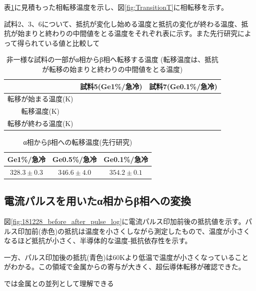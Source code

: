 表\ref{tab:transT}に見積もった相転移温度を示し、図\ref{fig:TransitionT}に相転移を示す。

試料2、3、6について、抵抗が変化し始める温度と抵抗の変化が終わる温度、抵抗が始まりと終わりの中間値をとる温度をそれぞれ表に示す。また先行研究によって得られている値と比較して
\begin{table}[!h]
  \begin{center}
  \begin{tabular}{ccc}
    & 試料5(Ge1\%/急冷) & 試料7(Ge0.1\%/急冷)\\ \hline
     転移が始まる温度(K)& &  \\
     転移温度(K)& &  \\
     転移が終わる温度(K)&  &  \\
  \end{tabular}
  \caption{非一様な試料の一部がα相からβ相へ転移する温度 (転移温度は、抵抗が転移の始まりと終わりの中間値をとる温度)}
  \label{tab:transT}
    \end{center}
\end{table}

\begin{table}[!h]
    \begin{center}
  \begin{tabular}{ccc}
    Ge1\%/急冷 & Ge0.5\%/急冷 & Ge0.1\%/急冷  \\ \hline
    $328.3\pm0.3$ & $346.6\pm4.0$ & $354.2\pm0.1$ \\
  \end{tabular}
  \caption{α相からβ相への転移温度(先行研究\cite{})}
  \label{tab:transT_ref}
    \end{center}
\end{table}

\subsection{電流パルスを用いたα相からβ相への変換}
図\ref{fig:181228_before_after_pulse_log}に電流パルス印加前後の抵抗値を示す。パルス印加前(赤色)の抵抗は温度を小さくしながら測定したもので、温度が小さくなるほど抵抗が小さく、半導体的な温度-抵抗依存性を示す。

一方、パルス印加後の抵抗(青色)は60Kより低温で温度が小さくなっていることがわかる。この領域で金属からの寄与が大きく、超伝導体転移が確認できた。

では金属との並列として理解できる\cite{Mayr,McLachlan}

